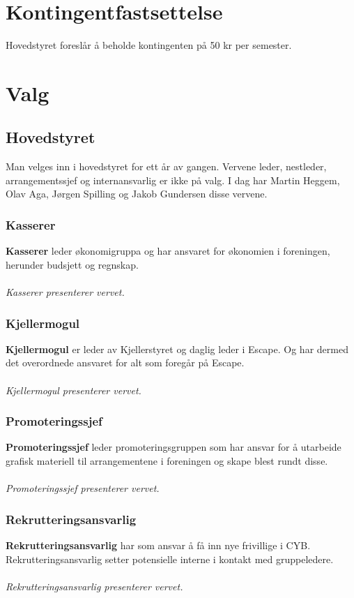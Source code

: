 \documentclass[10pt,norsk,a4paper]{article}
\begin{document}
\section{Kontingentfastsettelse}
Hovedstyret foreslår å beholde kontingenten på 50 kr per semester.

\section{Valg}
\subsection{Hovedstyret}
Man velges inn i hovedstyret for ett år av gangen. Vervene leder, 
nestleder, arrangementssjef og internansvarlig er ikke på valg. 
I dag har Martin Heggem, Olav Aga, Jørgen Spilling og Jakob 
Gundersen disse vervene.

\begin{multicols}{2}
\subsubsection{Kasserer}
\textbf{Kasserer} leder økonomigruppa og har ansvaret for økonomien i foreningen, herunder
budsjett og regnskap.
\\\\\textit{Kasserer presenterer vervet.}

\subsubsection{Kjellermogul}
\textbf{Kjellermogul} er leder av Kjellerstyret og daglig leder i
Escape. Og har dermed det overordnede ansvaret for alt som foregår på
Escape.
\\\\\textit{Kjellermogul presenterer vervet.}

\subsubsection{Promoteringssjef}
\textbf{Promoteringssjef} leder promoteringsgruppen som har ansvar for å
utarbeide grafisk materiell til arrangementene i foreningen og skape
blest rundt disse.
\\\\\textit{Promoteringssjef presenterer vervet.}

\subsubsection{Rekrutteringsansvarlig}
\textbf{Rekrutteringsansvarlig} har som ansvar å få inn nye frivillige i
CYB. Rekrutteringsansvarlig setter potensielle interne i kontakt med
gruppeledere.
\\\\\textit{Rekrutteringsansvarlig presenterer vervet.}

\end{multicols}
\end{document}
